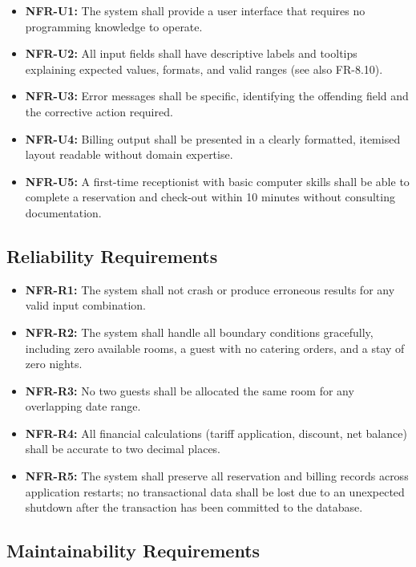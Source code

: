 \documentclass[12pt,a4paper]{article}
\begin{document}
\begin{itemize}[leftmargin=1.5em]
  \item \textbf{NFR-U1:} The system shall provide a user interface that requires no
        programming knowledge to operate.
  \item \textbf{NFR-U2:} All input fields shall have descriptive labels and tooltips
        explaining expected values, formats, and valid ranges (see also FR-8.10).
  \item \textbf{NFR-U3:} Error messages shall be specific, identifying the offending
        field and the corrective action required.
  \item \textbf{NFR-U4:} Billing output shall be presented in a clearly formatted,
        itemised layout readable without domain expertise.
  \item \textbf{NFR-U5:} A first-time receptionist with basic computer skills shall be
        able to complete a reservation and check-out within 10 minutes without consulting
        documentation.
\end{itemize}

\subsection{Reliability Requirements}

\begin{itemize}[leftmargin=1.5em]
  \item \textbf{NFR-R1:} The system shall not crash or produce erroneous results for any
        valid input combination.
  \item \textbf{NFR-R2:} The system shall handle all boundary conditions gracefully,
        including zero available rooms, a guest with no catering orders, and a stay of
        zero nights.
  \item \textbf{NFR-R3:} No two guests shall be allocated the same room for any
        overlapping date range.
  \item \textbf{NFR-R4:} All financial calculations (tariff application, discount, net
        balance) shall be accurate to two decimal places.
  \item \textbf{NFR-R5:} The system shall preserve all reservation and billing records
        across application restarts; no transactional data shall be lost due to an
        unexpected shutdown after the transaction has been committed to the database.
\end{itemize}

\subsection{Maintainability Requirements}
\end{document}
